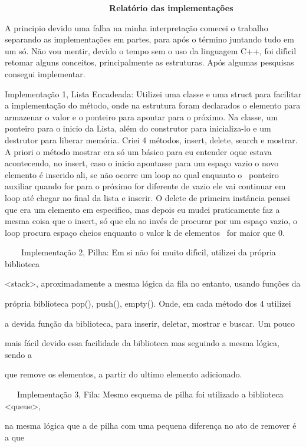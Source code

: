 \documentclass{article}
\begin{document}
{\bfseries \ \ \ \ \ \ \ \ \ \ \ \ \ \ \ \ \ \ \ \ \ \ Relat\'orio das implementa\c{c}\~oes}

A principio devido uma falha na minha interpreta\c{c}\~ao comecei o trabalho separando as implementa\c{c}\~oes em partes, para ap\'os o t\'ermino juntando tudo em um s\'o. N\~ao vou mentir, devido o tempo sem o uso da linguagem C++, foi dif\'{\i}cil retomar alguns conceitos, principalmente as estruturas. Ap\'os algumas pesquisas consegui implementar.

Implementa\c{c}\~ao 1, Lista Encadeada: Utilizei uma classe e uma struct para facilitar a implementa\c{c}\~ao do m\'etodo, onde na estrutura foram declarados o elemento para armazenar o valor e o ponteiro para apontar para o pr\'oximo. Na classe, um ponteiro para o inicio da Lista, al\'em do construtor para inicializa-lo e um destrutor para liberar mem\'oria. Criei 4 m\'etodos, insert, delete, search e mostrar. A priori o m\'etodo mostrar era s\'o um b\'asico para eu entender oque estava acontecendo, no insert, caso o inicio apontasse para um espa\c{c}o vazio o novo elemento \'e inserido ali, se n\~ao ocorre um loop ao qual enquanto o \ ponteiro auxiliar quando for para o pr\'oximo for diferente de vazio ele vai continuar em loop at\'e chegar no final da lista e inserir. O delete de primeira inst\^ancia pensei que era um elemento em especifico, mas depois eu mudei praticamente faz a mesma coisa que o insert, s\'o que ela ao inv\'es de procurar por um espa\c{c}o vazio, o loop procura espa\c{c}o cheios enquanto o valor k de elementos \ for maior que 0.

\ \ \ \ Implementa\c{c}\~ao 2, Pilha: Em si n\~ao foi muito dif\'{\i}cil, utilizei da pr\'opria biblioteca 

\textless{}stack\textgreater{}, aproximadamente a mesma l\'ogica da fila no entanto, usando fun\c{c}\~oes da

pr\'opria biblioteca pop(), push(), empty(). Onde, em cada m\'etodo dos 4 utilizei 

a devida fun\c{c}\~ao da biblioteca, para inserir, deletar, mostrar e buscar. Um pouco

mais f\'acil devido essa facilidade da biblioteca mas seguindo a mesma l\'ogica, sendo a 

que remove os elementos, a partir do ultimo elemento adicionado.

\ \ \ Implementa\c{c}\~ao 3, Fila: Mesmo esquema de pilha foi utilizado a biblioteca \textless{}queue\textgreater{}, 

na mesma l\'ogica que a de pilha com uma pequena diferen\c{c}a no ato de remover \'e a que 
\end{document}
